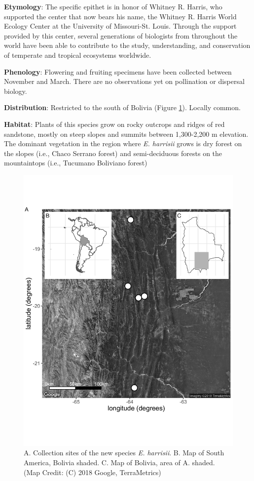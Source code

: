 \documentclass[fleqn,10pt,lineno]{wlpeerj} %
\begin{document}
\textbf{Etymology}: The specific epithet is in honor of Whitney R. Harris, who supported the center that now bears his name, the Whitney R. Harris World Ecology Center at the University of Missouri-St. Louis. Through the support provided by this center, several generations of biologists from throughout the world have been able to contribute to the study, understanding, and conservation of temperate and tropical ecosystems worldwide.

\textbf{Phenology}: Flowering and fruiting specimens have been collected between November and March. There are no observations yet on pollination or dispersal biology.

\textbf{Distribution}: Restricted to the south of Bolivia (Figure \ref{fig:Figure7}). Locally common.

\textbf{Habitat}: Plants of this species grow on rocky outcrops and ridges of red sandstone, mostly on steep slopes and summits between 1,300-2,200 m elevation. The dominant vegetation in the region where \emph{E. harrisii} grows is dry forest on the slopes (i.e., Chaco Serrano forest) and semi-deciduous forests on the mountaintops (i.e., Tucumano Boliviano forest) 

\begin{figure}[ht]
\centering
\includegraphics[width=\linewidth]{Figure7}
\caption{A. Collection sites of the new species \emph{E. harrisii}. B. Map of South America, Bolivia shaded. C. Map of Bolivia, area of A. shaded. (Map Credit: (C) 2018 Google, TerraMetrics)}
\label{fig:Figure7}
\end{figure}
\end{document}
